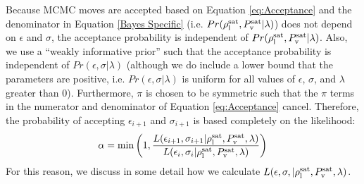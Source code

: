 \documentclass[journal=jctc,manuscript=article]{achemso}
\begin{document}
Because MCMC moves are accepted based on Equation \ref{eq:Acceptance} and the denominator in Equation \ref{Bayes Specific} (i.e. $Pr(\rho_{\rm l}^{\rm sat},P_{\rm v}^{\rm sat}|\lambda)$) does not depend on $\epsilon$ and $\sigma$, the acceptance probability is independent of $Pr(\rho_{\rm l}^{\rm sat},P_{\rm v}^{\rm sat}|\lambda)$. 
Also, we use a ``weakly informative prior'' such that the acceptance probability is independent of $Pr(\epsilon,\sigma|\lambda)$ (although we do include a lower bound that the parameters are positive, i.e. $Pr(\epsilon,\sigma|\lambda)$ is uniform for all values of $\epsilon$, $\sigma$, and $\lambda$ greater than 0). Furthermore, $\pi$ is chosen to be symmetric such that the $\pi$ terms in the numerator and denominator of Equation \ref{eq:Acceptance} cancel. Therefore, the probability of accepting $\epsilon_{i+1}$ and $\sigma_{i+1}$ is based completely on the likelihood:
\begin{equation} \label{eq:Acceptance Assumptions}
\alpha = \min\left(1,\frac{L(\epsilon_{i+1},\sigma_{i+1}|\rho_{\rm l}^{\rm sat},P_{\rm v}^{\rm sat},\lambda)}{L(\epsilon_i,\sigma_i|\rho_{\rm l}^{\rm sat},P_{\rm v}^{\rm sat},\lambda)}\right)
\end{equation} 
For this reason, we discuss in some detail how we calculate $L(\epsilon,\sigma,|\rho_{\rm l}^{\rm sat},P_{\rm v}^{\rm sat},\lambda)$.  
\end{document}
